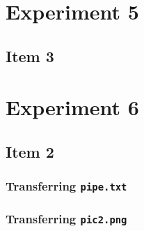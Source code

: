 \documentclass[a4paper, 11pt]{report}
\begin{document}
\section{Experiment 5}
\setcounter{subsection}{2}
\subsection{Item 3}
                 
\begin{landscape}\end{landscape}

\section{Experiment 6}

\setcounter{subsection}{1}
\subsection{Item 2}
\subsubsection{Transferring \texttt{pipe.txt}}
                 
\begin{landscape}\end{landscape}

\subsubsection{Transferring \texttt{pic2.png}}
                 
\begin{landscape}\end{landscape}
\end{document}
